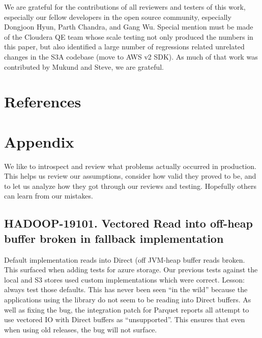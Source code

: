 \documentclass[manuscript]{acmart}
\begin{document}
\begin{acks}
We are grateful for the contributions of all reviewers and testers of this work,
especially our fellow developers in the open source community,
especially Dongjoon Hyun, Parth Chandra, and Gang Wu.
Special mention must be made of the Cloudera QE team whose scale testing
not only produced the numbers in this paper, but also identified a large number
of regressions related unrelated changes in the S3A codebase (move to AWS v2 SDK).
As much of that work was contributed by Mukund and Steve, we are grateful.
\end{acks}



\section{References}
\label{sec:references}







\appendix{}

\section{Appendix}
We like to introspect and review what problems actually occurred
in production.
This helps us review our assumptions, consider how valid they proved
to be, and to let us analyze how they got through our reviews and testing.
Hopefully others can learn from our mistakes.


\subsection{HADOOP-19101. Vectored Read into off-heap buffer broken in fallback implementation}
\label{HADOOP-19101}

Default implementation reads into Direct (off JVM-heap buffer reads broken.
This surfaced when adding tests for azure storage.
Our previous tests against the local and S3 stores used custom implementations
which were correct. Lesson: always test those defaults.
This has never been seen ``in the wild'' because the applications
using the library do not seem to be reading into Direct buffers.
As well as fixing the bug, the integration patch for Parquet reports all
attempt to use vectored IO with Direct buffers as ``unsupported''.
This ensures that even when using old releases, the bug will not surface.
\end{document}
